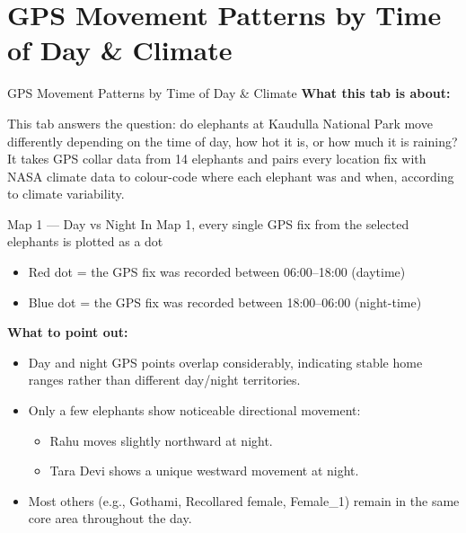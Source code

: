 \documentclass{beamer}
\begin{document}
	
	
	
	\section{GPS Movement Patterns by Time of Day \& Climate}
	\begin{frame}{GPS Movement Patterns by Time of Day \& Climate}
		\Large
		\textbf{What this tab is about:}
		\vspace{4pt}
		
		This tab answers the question: do elephants at Kaudulla National Park move
		differently depending on the time of day, how hot it is, or how much it is
		raining? It takes GPS collar data from 14 elephants and pairs every location
		fix with NASA climate data to colour-code where each elephant was and when,
		according to climate variability.
	\end{frame}
	
	
	
	
	
	
	\begin{frame}{Map 1 --- Day vs Night}
		In Map 1, every single GPS fix from the selected elephants is plotted as a dot
		
		
		\begin{itemize}
			\item Red dot = the GPS fix was recorded between 06:00--18:00 (daytime)
			\item Blue dot = the GPS fix was recorded between 18:00--06:00 (night-time)
		\end{itemize}
		
		\vspace{6pt}
		\textbf{What to point out:}
		\begin{itemize}
			\item Day and night GPS points overlap considerably, indicating stable
			home ranges rather than different day/night territories.
			\item Only a few elephants show noticeable directional movement:
			\begin{itemize}
				\item Rahu moves slightly northward at night.
				\item Tara Devi shows a unique westward movement at night.
			\end{itemize}
			\item Most others (e.g., Gothami, Recollared female, Female\_1) remain in
			the same core area throughout the day.
		\end{itemize}
	\end{frame}
	
\end{document}
